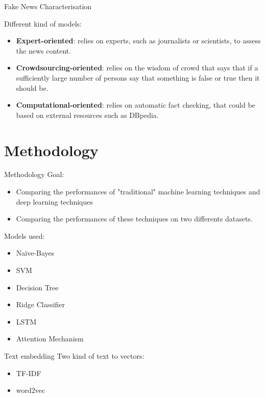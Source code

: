 \documentclass{beamer}
\begin{document}
\begin{frame}[allowframebreaks]{Fake News Characterisation}
\begin{figure}
	\end{figure}
	\newpage
  Different kind of models:
	  	\begin{itemize}
		 \item \textbf{Expert-oriented}: relies on experts, such as journalists or scientists, to assess the news content.
		 \item \textbf{Crowdsourcing-oriented}: relies on the wisdom of crowd that says that if a sufficiently large number of persons say that something is false or true then it should be.
		 \item \textbf{Computational-oriented}: relies on automatic fact checking, that could be based on external resources such as DBpedia.
		\end{itemize}
		\note{}
	\end{frame}
	\section{Methodology}
	\begin{frame}[allowframebreaks]{Methodology}
		Goal:
		\begin{itemize}
			\item Comparing the performances of "traditional" machine learning techniques and deep learning techniques
			\item Comparing the performances of these techniques on two differents datasets.
		\end{itemize}
		\note{}
		\newpage
		Models used:
		\begin{itemize}
			\item Na\"ive-Bayes
			\item SVM
			\item Decision Tree
			\item Ridge Classifier
			\item LSTM
			\item Attention Mechanism\cite{zhou-etal-2016-attention}
		\end{itemize}
		\note{}
	\end{frame}
	\begin{frame}{Text embedding}
		Two kind of text to vectors: 
		\begin{itemize}
			\item TF-IDF
			\item word2vec\cite{Mikolov2013}
		\end{itemize}
		\note{}
	\end{frame}
\end{document}
